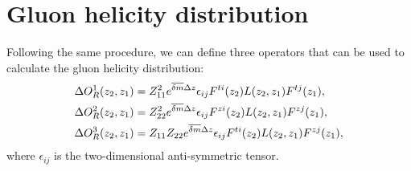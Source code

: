 \section{Gluon helicity distribution}\label{sec:helicity}

Following the same procedure, we can define three operators that can be used to calculate the gluon helicity distribution:
\begin{align}
\Delta {O}^{1}_R(z_2, z_1) &= Z_{11}^2 e^{\overline{\delta { m}}\Delta z}  \epsilon_{ij}  F^{ti}(z_2) L(z_2,z_1) F^{tj}(z_1), \nonumber\\
 \Delta{  O}^{2}_R(z_2,z_1) &=  Z_{22}^2 e^{\overline{\delta { m}}\Delta z} \epsilon_{ij}  F^{zi}(z_2) L(z_2,z_1) F^{zj}(z_1),\nonumber\\
\Delta {O}^{3}_R(z_2,z_1) &=  Z_{11}Z_{22} e^{\overline{\delta { m}}\Delta z}  \epsilon_{ij} F^{ti}(z_2) L(z_2,z_1) F^{zj}(z_1),
\end{align}
where $ \epsilon_{ij} $ is the two-dimensional anti-symmetric tensor.
